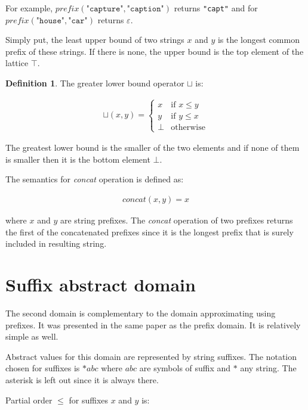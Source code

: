 \documentclass[12pt,final,oneside]{fithesis2}
\theoremstyle{definition}
\newtheorem{definition}{Definition}
\begin{document}
For example, $\textit{prefix}(\texttt{"capture"}, \texttt{"caption"})$ returns
\texttt{"capt"} and for $\textit{prefix}(\texttt{"house"}, \texttt{"car"})$
returns $\varepsilon$.

Simply put, the least upper bound of two strings $x$ and $y$
is the longest common prefix of these strings. If there is
none, the upper bound is the top element of the lattice $\top$.

\begin{definition}
\label{def:prefixmeet}
The greater lower bound operator $\sqcup$ is:

\begin{align*}
\sqcup (x, y) =
\begin{cases}
x    & \text{if } x \leq y \\
y    & \text{if } y \leq x \\
\bot & \text{otherwise}
\end{cases}
\end{align*}
\end{definition}

The greatest lower bound is the smaller of the two elements and if none
of them is smaller then it is the bottom element $\bot$.

The semantics for \textit{concat} operation is defined as:

\begin{align*}
\textit{concat}(x, y) = x
\end{align*}

where $x$ and $y$ are string prefixes. The \textit{concat} operation of two
prefixes returns the first of the concatenated prefixes since it is the
longest prefix that is surely included in resulting string.


\section{Suffix abstract domain}

The second domain is complementary to the domain approximating using
prefixes. It was presented in the same paper \cite{Constantini11-1} as the
prefix domain. It is relatively simple as well.

Abstract values for this domain are represented by string suffixes.
The notation chosen for suffixes is $*abc$ where $abc$ are symbols of
suffix and $*$ any string. The asterisk is left out since it is always
there.

Partial order $\leq$ for suffixes $x$ and $y$ is:
\end{document}
